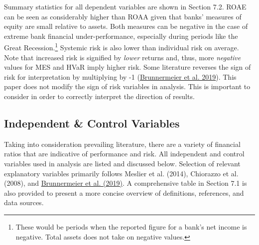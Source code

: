 \documentclass[10pt]{article} %
\begin{document}
\par Summary statistics for all dependent variables are shown in Section 7.2. ROAE can be seen as considerably higher than ROAA given that banks' measures of equity are small relative to assets. Both measures can be negative in the case of extreme bank financial under-performance, especially during periods like the Great Recession.\footnote{These would be periods when the reported figure for a bank's net income is negative. Total assets does not take on negative values.} Systemic risk is also lower than individual risk on average. Note that increased risk is signified by \textit{lower} returns and, thus, more \textit{negative} values for MES and HVaR imply higher risk. Some literature reverses the sign of risk for interpretation by multiplying by -1 (\hyperlink{Brunner}{Brunnermeier et al. 2019}). This paper does not modify the sign of risk variables in analysis. This is important to consider in order to correctly interpret the direction of results.

\subsection{Independent \& Control Variables}
Taking into consideration prevailing literature, there are a variety of financial ratios that are indicative of performance and risk. All independent and control variables used in analysis are listed and discussed below. Selection of relevant explanatory variables primarily follows Meslier et al. (2014), Chiorazzo et al. (2008), and \hyperlink{Brunner}{Brunnermeier et al. (2019)}. A comprehensive table in Section 7.1 is also provided to present a more concise overview of definitions, references, and data sources. 
\end{document}
